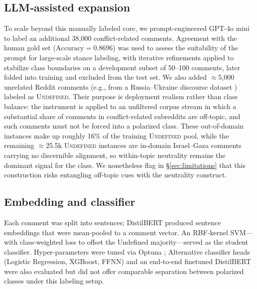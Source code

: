 \documentclass[letterpaper]{article} %
\begin{document}
\subsection{LLM‐assisted expansion}
To scale beyond this manually labeled core, we prompt-engineered GPT-4o mini to label an additional 38,000 conflict-related comments. Agreement with the human gold set ($\text{Accuracy}=0.8696$) was used to assess the suitability of the prompt for large-scale stance labeling, with iterative refinements applied to stabilize class boundaries on a development subset of 50--100 comments, later folded into training and excluded from the test set. We also added $\approx$5,000 unrelated Reddit comments (e.g., from a Russia--Ukraine discourse dataset \cite{ukraine_russia_reddit_data}) labeled as \textsc{Undefined}. Their purpose is deployment realism rather than class balance: the instrument is applied to an unfiltered corpus stream in which a substantial share of comments in conflict-related subreddits are off-topic, and such comments must not be forced into a polarized class. These out-of-domain instances make up roughly 16\% of the training \textsc{Undefined} pool, while the remaining $\approx$25.5k \textsc{Undefined} instances are in-domain Israel--Gaza comments carrying no discernible alignment, so within-topic neutrality remains the dominant signal for the class. We nonetheless flag in \S\ref{sec:limitations} that this construction risks entangling off-topic cues with the neutrality construct.

\begin{table}[t]
\centering
\caption{Class distribution in the human-labeled (gold) and GPT-labeled datasets.}
\label{tab:samples_per_class_israel_palestine}
\end{table}

\subsection{Embedding and classifier}
Each comment was split into sentences; DistilBERT produced sentence embeddings that were mean-pooled to a comment vector. An RBF-kernel SVM---with class-weighted loss to offset the Undefined majority---served as the student classifier. Hyper-parameters were tuned via Optuna \cite{akiba2019optuna}; Alternative classifier heads (Logistic Regression, XGBoost, FFNN) and an end-to-end finetuned DistilBERT were also evaluated but did not offer comparable separation between polarized classes under this labeling setup.
\end{document}
